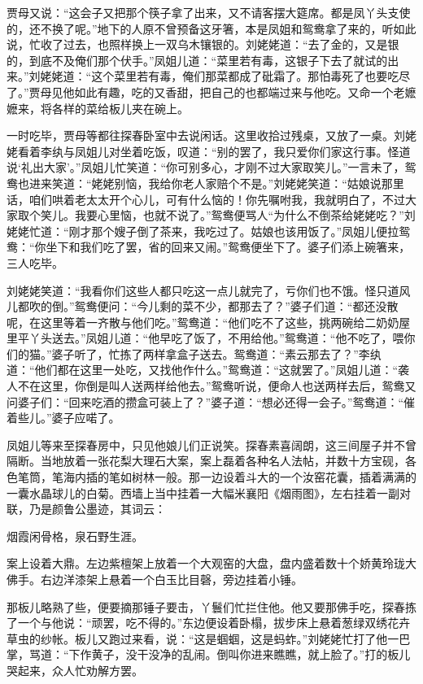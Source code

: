 贾母又说：``这会子又把那个筷子拿了出来，又不请客摆大筵席。都是凤丫头支使的，还不换了呢。''地下的人原不曾预备这牙箸，本是凤姐和鸳鸯拿了来的，听如此说，忙收了过去，也照样换上一双乌木镶银的。刘姥姥道：``去了金的，又是银的，到底不及俺们那个伏手。''凤姐儿道：``菜里若有毒，这银子下去了就试的出来。''刘姥姥道：``这个菜里若有毒，俺们那菜都成了砒霜了。那怕毒死了也要吃尽了。''贾母见他如此有趣，吃的又香甜，把自己的也都端过来与他吃。又命一个老嬷嬷来，将各样的菜给板儿夹在碗上。

一时吃毕，贾母等都往探春卧室中去说闲话。这里收拾过残桌，又放了一桌。刘姥姥看着李纨与凤姐儿对坐着吃饭，叹道：``别的罢了，我只爱你们家这行事。怪道说`礼出大家'。''凤姐儿忙笑道：``你可别多心，才刚不过大家取笑儿。''一言未了，鸳鸯也进来笑道：``姥姥别恼，我给你老人家赔个不是。''刘姥姥笑道：``姑娘说那里话，咱们哄着老太太开个心儿，可有什么恼的！你先嘱咐我，我就明白了，不过大家取个笑儿。我要心里恼，也就不说了。''鸳鸯便骂人``为什么不倒茶给姥姥吃？''刘姥姥忙道：``刚才那个嫂子倒了茶来，我吃过了。姑娘也该用饭了。''凤姐儿便拉鸳鸯：``你坐下和我们吃了罢，省的回来又闹。''鸳鸯便坐下了。婆子们添上碗箸来，三人吃毕。

刘姥姥笑道：``我看你们这些人都只吃这一点儿就完了，亏你们也不饿。怪只道风儿都吹的倒。''鸳鸯便问：``今儿剩的菜不少，都那去了？''婆子们道：``都还没散呢，在这里等着一齐散与他们吃。''鸳鸯道：``他们吃不了这些，挑两碗给二奶奶屋里平丫头送去。''凤姐儿道：``他早吃了饭了，不用给他。''鸳鸯道：``他不吃了，喂你们的猫。''婆子听了，忙拣了两样拿盒子送去。鸳鸯道：``素云那去了？''李纨道：``他们都在这里一处吃，又找他作什么。''鸳鸯道：``这就罢了。''凤姐儿道：``袭人不在这里，你倒是叫人送两样给他去。''鸳鸯听说，便命人也送两样去后，鸳鸯又问婆子们：``回来吃酒的攒盒可装上了？''婆子道：``想必还得一会子。''鸳鸯道：``催着些儿。''婆子应喏了。

凤姐儿等来至探春房中，只见他娘儿们正说笑。探春素喜阔朗，这三间屋子并不曾隔断。当地放着一张花梨大理石大案，案上磊着各种名人法帖，并数十方宝砚，各色笔筒，笔海内插的笔如树林一般。那一边设着斗大的一个汝窑花囊，插着满满的一囊水晶球儿的白菊。西墙上当中挂着一大幅米襄阳《烟雨图》，左右挂着一副对联，乃是颜鲁公墨迹，其词云：

烟霞闲骨格，泉石野生涯。

案上设着大鼎。左边紫檀架上放着一个大观窑的大盘，盘内盛着数十个娇黄玲珑大佛手。右边洋漆架上悬着一个白玉比目磬，旁边挂着小锤。

那板儿略熟了些，便要摘那锤子要击，丫鬟们忙拦住他。他又要那佛手吃，探春拣了一个与他说：``顽罢，吃不得的。''东边便设着卧榻，拔步床上悬着葱绿双绣花卉草虫的纱帐。板儿又跑过来看，说：``这是蝈蝈，这是蚂蚱。''刘姥姥忙打了他一巴掌，骂道：``下作黄子，没干没净的乱闹。倒叫你进来瞧瞧，就上脸了。''打的板儿哭起来，众人忙劝解方罢。

